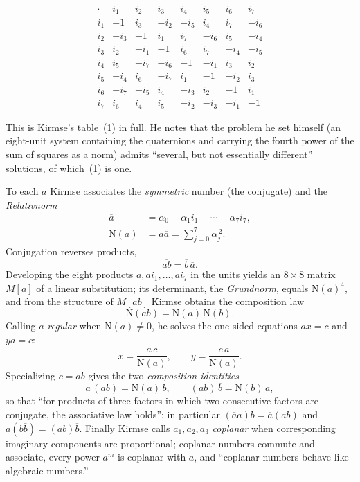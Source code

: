 \documentclass[11pt]{amsart}
\newcommand{\Nm}{\mathrm{N}}
\newcommand{\cj}[1]{\overline{#1}}
\numberwithin{equation}{section}
\theoremstyle{definition}
\theoremstyle{plain}
\theoremstyle{remark}
\begin{document}
\smallskip
\[
\renewcommand{\arraystretch}{1.25}
\begin{array}{c|ccccccc}
\cdot & i_1 & i_2 & i_3 & i_4 & i_5 & i_6 & i_7\\\hline
i_1 & -1   & i_3  & -i_2 & -i_5 & i_4  & i_7  & -i_6\\
i_2 & -i_3 & -1   & i_1  & i_7  & -i_6 & i_5  & -i_4\\
i_3 & i_2  & -i_1 & -1   & i_6  & i_7  & -i_4 & -i_5\\
i_4 & i_5  & -i_7 & -i_6 & -1   & -i_1 & i_3  & i_2\\
i_5 & -i_4 & i_6  & -i_7 & i_1  & -1   & -i_2 & i_3\\
i_6 & -i_7 & -i_5 & i_4  & -i_3 & i_2  & -1   & i_1\\
i_7 & i_6  & i_4  & i_5  & -i_2 & -i_3 & -i_1 & -1
\end{array}
\]
\smallskip

\noindent
This is Kirmse's table~(1) in full.  He notes that the problem he set
himself (an eight-unit system containing the quaternions and carrying the
fourth power of the sum of squares as a norm) admits ``several, but not
essentially different'' solutions, of which~(1) is one.

To each $a$ Kirmse associates the \emph{symmetric} number (the conjugate)
and the \emph{Relativnorm}
\begin{align}
  \cj a &= \alpha_0 - \alpha_1 i_1 - \cdots - \alpha_7 i_7,
  \label{eq:conj}\\
  \Nm(a) &= a\cj a = \sum_{j=0}^{7} \alpha_j^{\,2}.
  \label{eq:norm}
\end{align}
Conjugation reverses products,
\begin{equation}\label{eq:antiauto}
  \cj{a b} = \cj b\,\cj a .
\end{equation}
Developing the eight products $a, a i_1, \ldots, a i_7$ in the units yields
an $8\times8$ matrix $M[a]$ of a linear substitution; its determinant, the
\emph{Grundnorm}, equals $\Nm(a)^4$, and from the structure of $M[ab]$
Kirmse obtains the composition law
\begin{equation}\label{eq:comp}
  \Nm(ab) = \Nm(a)\,\Nm(b).
\end{equation}
Calling $a$ \emph{regular} when $\Nm(a)\neq 0$, he solves the one-sided
equations $ax=c$ and $ya=c$:
\begin{equation}\label{eq:div}
  x = \frac{\cj a\,c}{\Nm(a)},
  \qquad
  y = \frac{c\,\cj a}{\Nm(a)} .
\end{equation}
Specializing $c=ab$ gives the two \emph{composition identities}
\begin{equation}\label{eq:kirmse-id}
  \cj a\,(a b) = \Nm(a)\,b,
  \qquad
  (a b)\,\cj b = \Nm(b)\,a,
\end{equation}
so that ``for products of three factors in which two consecutive factors are
conjugate, the associative law holds'': in particular
$(\cj a a)b = \cj a(ab)$ and $a(b\cj b) = (ab)\cj b$.  Finally Kirmse calls
$a_1,a_2,a_3$ \emph{coplanar} when corresponding imaginary components are
proportional; coplanar numbers commute and associate, every power $a^m$ is
coplanar with $a$, and ``coplanar numbers behave like algebraic numbers.''
\end{document}
